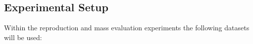 

%

\subsection{Experimental Setup}
\label{section:repro_experimental_setup}

Within the reproduction and mass evaluation experiments the following datasets will be used: 

